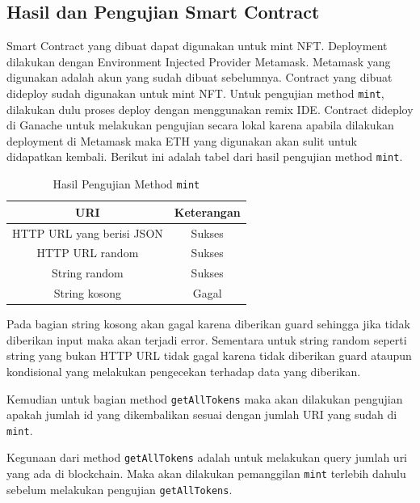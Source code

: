 \subsection{Hasil dan Pengujian Smart Contract}
Smart Contract yang dibuat dapat digunakan untuk mint NFT. Deployment dilakukan dengan Environment Injected Provider Metamask.
Metamask yang digunakan adalah akun yang sudah dibuat sebelumnya. Contract yang dibuat dideploy sudah digunakan untuk mint NFT.
Untuk pengujian method \texttt{mint}, dilakukan dulu proses deploy dengan menggunakan remix IDE. Contract dideploy di Ganache untuk melakukan pengujian secara lokal karena apabila dilakukan deployment di
Metamask maka ETH yang digunakan akan sulit untuk didapatkan kembali. Berikut ini adalah tabel dari hasil pengujian method \texttt{mint}.
\begin{longtable}{|c|c|}
  \caption{Hasil Pengujian Method \texttt{mint}}
  \label{tb:UjiMint}                              \\
  \hline
  \rowcolor[HTML]{C0C0C0}
  \textbf{URI}              & \textbf{Keterangan} \\
  \hline
  HTTP URL yang berisi JSON & Sukses              \\
  HTTP URL random           & Sukses              \\
  String random             & Sukses              \\
  String kosong             & Gagal               \\
  \hline
\end{longtable}

Pada bagian string kosong akan gagal karena diberikan guard sehingga jika tidak diberikan input maka akan terjadi error.
Sementara untuk string random seperti string yang bukan HTTP URL tidak gagal karena tidak diberikan guard ataupun kondisional yang melakukan
pengecekan terhadap data yang diberikan.

Kemudian untuk bagian method \texttt{getAllTokens} maka akan dilakukan pengujian apakah jumlah id yang dikembalikan sesuai dengan jumlah URI yang sudah di \texttt{mint}.

Kegunaan dari method \texttt{getAllTokens} adalah untuk melakukan query jumlah uri yang ada di blockchain. Maka akan dilakukan pemanggilan \texttt{mint} terlebih dahulu
sebelum melakukan pengujian \texttt{getAllTokens}.

